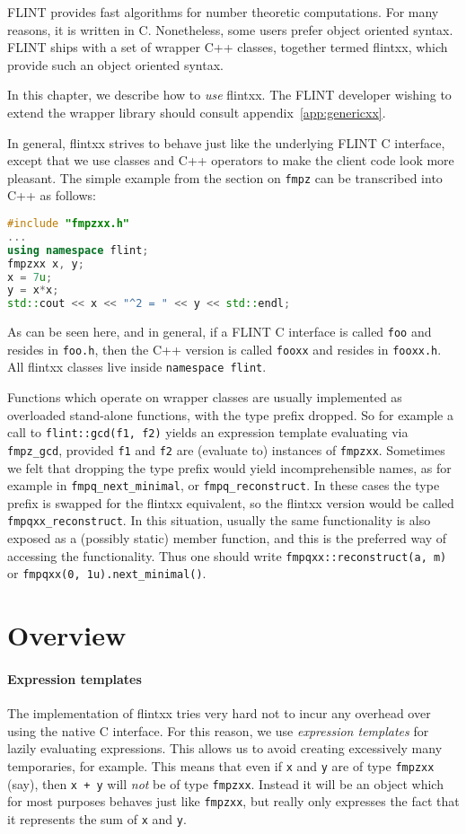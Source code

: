 \documentclass[a4paper,10pt]{book}
\newcommand{\code}{\lstinline}
\begin{document}
{{FLINT provides fast algorithms for number theoretic computations. For many
reasons, it is written in C. Nonetheless, some users prefer object oriented
syntax. FLINT ships with a set of wrapper C++ classes, together termed flintxx,
which provide such an object oriented syntax.

In this chapter, we describe how to \emph{use} flintxx. The FLINT developer
wishing to extend the wrapper library should consult
appendix~\ref{app:genericxx}.

In general, flintxx strives to behave just like the underlying FLINT C
interface, except that we use classes and C++ operators to make the client code
look more pleasant. The simple example from the section on \code{fmpz} can be
transcribed into C++ as follows:

\begin{lstlisting}[language=c++]
#include "fmpzxx.h"
...
using namespace flint;
fmpzxx x, y;
x = 7u;
y = x*x;
std::cout << x << "^2 = " << y << std::endl;
\end{lstlisting}

As can be seen here, and in general, if a FLINT C interface is called \code{foo}
and resides in \code{foo.h}, then the C++ version is called \code{fooxx} and
resides in \code{fooxx.h}. All flintxx classes live inside
\code{namespace flint}.

Functions which operate on wrapper classes are usually implemented as overloaded
stand-alone functions, with the type prefix dropped. So for example a call to
\code{flint::gcd(f1, f2)} yields an expression template evaluating via
\code{fmpz_gcd}, provided \code{f1} and \code{f2} are (evaluate to) instances of
\code{fmpzxx}. Sometimes we felt that dropping the type prefix would yield
incomprehensible names, as for example in \code{fmpq_next_minimal}, or
\code{fmpq_reconstruct}. In these cases the type prefix is swapped for the
flintxx equivalent, so the flintxx version would be called
\code{fmpqxx_reconstruct}. In this situation, usually the same functionality is
also exposed as a (possibly static) member function, and this is the preferred
way of accessing the functionality. Thus one should write
\code{fmpqxx::reconstruct(a, m)} or \code{fmpqxx(0, 1u).next_minimal()}.

\section{Overview}

\paragraph{Expression templates}
The implementation of flintxx tries very hard not to incur any overhead over
using the native C interface. For this reason, we use \emph{expression
templates} for lazily evaluating expressions. This allows us to avoid creating
excessively many temporaries, for example. This means that even if \code{x} and
\code{y} are of type \code{fmpzxx} (say), then \code{x + y} will \emph{not} be
of type \code{fmpzxx}. Instead it will be an object which for most purposes
behaves just like \code{fmpzxx}, but really only expresses the fact that it
represents the sum of \code{x} and \code{y}.

}}
\end{document}
